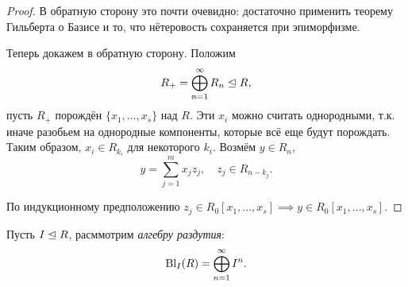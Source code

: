 	\begin{proof}
		В обратную сторону это почти очевидно: достаточно применить теорему Гильберта о Базисе и то, что нётеровость сохраняется при эпиморфизме. 

		Теперь докажем в обратную сторону.  Положим 
		\[
			R_{+} = \bigoplus_{n = 1}^{\infty} R_n \trianglelefteq R,
		\]
		пусть $R_+$ порождён $\{ x_1, \ldots, x_s \}$  над $R$. Эти $x_i$ можно считать однородными, т.к. иначе разобьем на однородные компоненты, которые всё еще будут порождать. Таким образом, $x_i \in R_{k_i}$ для некоторого $k_i$. Возмём $y \in R_n$, 
		\[
			y = \sum_{j = 1}^{m} x_j z_j, \quad z_j \in R_{n - k_j}.
		\]

		По индукционному предположению $z_j \in R_0[x_1, \ldots, x_s] \implies y \in R_{0}[x_1, \ldots, x_s]$.
	\end{proof}

	Пусть $I \trianglelefteq R$, расммотрим \emph{алгебру раздутия}: 
	\[
		\Bl_{I}\lr*{R} = \bigoplus_{n = 1}^{\infty} I^{n}. 
	\]
	



